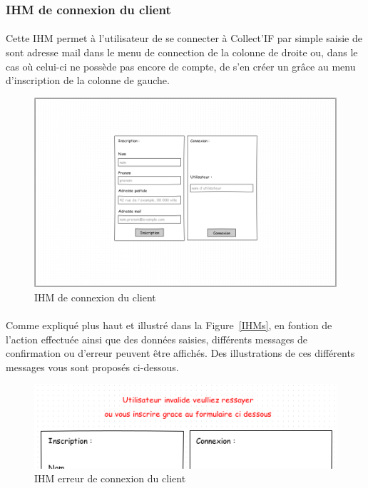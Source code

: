 \documentclass[a4paper,11pt]{article}
\begin{document}
\subsubsection{IHM de connexion du client}

\paragraph{}
Cette IHM permet à l'utilisateur de se connecter à Collect'IF par simple saisie de sont adresse mail dans le menu de connection de la colonne de droite ou, dans le cas où celui-ci ne possède pas encore de compte, de s'en créer un grâce au menu d'inscription de la colonne de gauche.

\begin{figure}[H]
  \begin{center}
    \includegraphics[width=15cm]{../../IHM/IHM_connection_utilisateur.png}
    \caption{IHM de connexion du client}
  \end{center}
\end{figure}

\paragraph{}
Comme expliqué plus haut et illustré dans la Figure~\ref{IHMs}, en fontion de l'action effectuée ainsi que des données saisies, différents messages de confirmation ou d'erreur peuvent être affichés. Des illustrations de ces différents messages vous sont proposés ci-dessous.

\begin{figure}[H]
  \begin{center}
    \includegraphics[width=15cm]{../../IHM/IHM_connection_utilisateur_erreur_co_z.png}
    \caption{IHM erreur de connexion du client}
  \end{center}
\end{figure}
\end{document}
